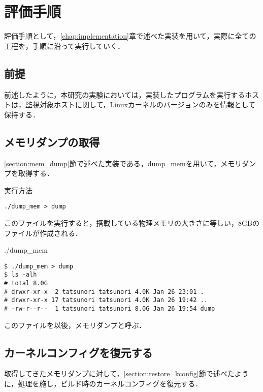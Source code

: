 \section{評価手順}
\label{section:eval}

評価手順として，\ref{chap:implementation}章で述べた実装を用いて，実際に全ての工程を，手順に沿って実行していく．

\subsection{前提}

前述したように，本研究の実験においては，実装したプログラムを実行するホストは，監視対象ホストに関して，Linuxカーネルのバージョンのみを情報として保持する．

\subsection{メモリダンプの取得}
\label{subsection:eval_dump_mem}

\ref{section:mem_dump}節で述べた実装である，dump_memを用いて，メモリダンプを取得する．

\begin{itembox}[l]{実行方法}
    \begin{verbatim}
./dump_mem > dump
    \end{verbatim}
\end{itembox}

このファイルを実行すると，搭載している物理メモリの大きさに等しい，8GBのファイルが作成される．

\begin{itembox}[l]{./dump_mem}
    \begin{verbatim}
$ ./dump_mem > dump
$ ls -alh
# total 8.0G
# drwxr-xr-x  2 tatsunori tatsunori 4.0K Jan 26 23:01 .
# drwxr-xr-x 17 tatsunori tatsunori 4.0K Jan 26 19:42 ..
# -rw-r--r--  1 tatsunori tatsunori 8.0G Jan 26 19:54 dump
    \end{verbatim}
\end{itembox}

このファイルを以後，メモリダンプと呼ぶ．

\subsection{カーネルコンフィグを復元する}
\label{subsection:eval_restore_kconfig}

取得してきたメモリダンプに対して，\ref{section:restore_kconfig}節で述べたように，処理を施し，ビルド時のカーネルコンフィグを復元する．

